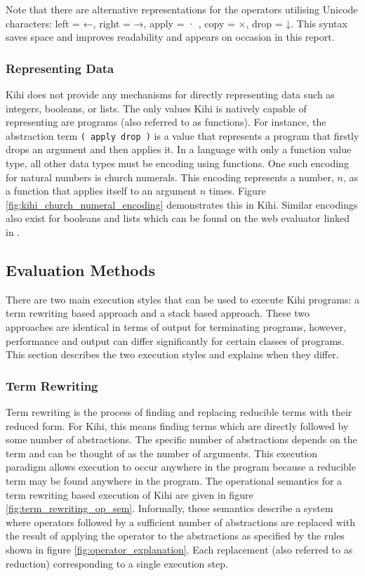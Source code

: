 


Note that there are alternative representations for the operators utilising Unicode characters: left = ←, right = →, apply = · , copy = ×, drop = ↓. This syntax saves space and improves readability and appears on occasion in this report.


\subsubsection{Representing Data}
Kihi does not provide any mechanisms for directly representing data such as integers, booleans, or lists. The only values Kihi is natively capable of representing are programs (also referred to as functions). For instance, the abstraction term \lstinline{( apply drop )} is a value that represents a program that firstly drops an argument and then applies it. In a language with only a function value type, all other data types must be encoding using functions. One such encoding for natural numbers is church numerals. This encoding represents a number, $n$, as a function that applies itself to an argument $n$ times. Figure \ref{fig:kihi_church_numeral_encoding} demonstrates this in Kihi. Similar encodings also exist for booleans and lists which can be found on the web evaluator linked in \cite{jones2018practice}.

\subsection{Evaluation Methods}\label{sec:background_evaluation_methods}
There are two main execution styles that can be used to execute Kihi programs: a term rewriting based approach and a stack based approach. These two approaches are identical in terms of output for terminating programs, however, performance and output can differ significantly for certain classes of programs. This section describes the two execution styles and explains when they differ.

\subsubsection*{Term Rewriting}
Term rewriting is the process of finding
and replacing reducible terms with their reduced form. For Kihi,
this means finding terms which are directly followed by
some number of abstractions. The specific number of abstractions depends on the term and can be thought of as the
number of arguments. This execution paradigm allows execution
to occur anywhere in the program because a reducible term may
be found anywhere in the program. The operational semantics for a term rewriting based execution of
Kihi are given in figure \ref{fig:term_rewriting_op_sem}. Informally, these semantics describe a system where operators followed by a sufficient number of abstractions are replaced with the result of applying the operator to the abstractions as specified by the rules shown in figure \ref{fig:operator_explanation}. Each replacement (also referred to as reduction) corresponding to a single execution step.

